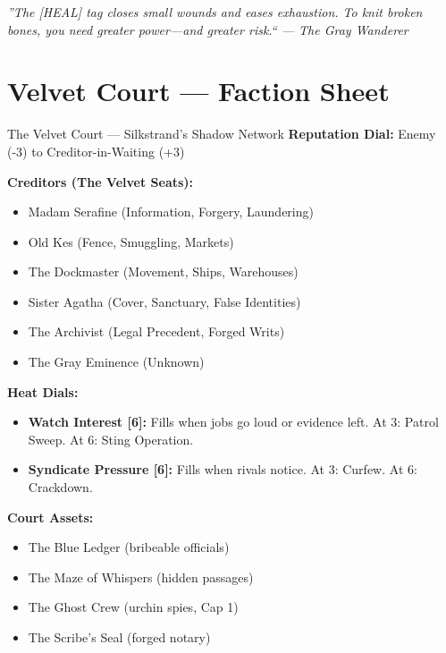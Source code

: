 \documentclass[10pt]{article}
\begin{document}
\vspace{0.5em}
\begin{center}
    {\small\sffamily\itshape ''The [HEAL] tag closes small wounds and eases exhaustion. To knit broken bones, you need greater power---and greater risk.`` --- The Gray Wanderer}
\end{center}

\newpage


\section*{Velvet Court --- Faction Sheet}

\begin{tipbox}{The Velvet Court --- Silkstrand's Shadow Network}
    \textbf{Reputation Dial:} Enemy (-3) to Creditor-in-Waiting (+3)
    
    \textbf{Creditors (The Velvet Seats):}
    \begin{itemize}
        \item Madam Serafine (Information, Forgery, Laundering)
        \item Old Kes (Fence, Smuggling, Markets)
        \item The Dockmaster (Movement, Ships, Warehouses)
        \item Sister Agatha (Cover, Sanctuary, False Identities)
        \item The Archivist (Legal Precedent, Forged Writs)
        \item The Gray Eminence (Unknown)
    \end{itemize}
    
    \textbf{Heat Dials:}
    \begin{itemize}
        \item \textbf{Watch Interest [6]:} Fills when jobs go loud or evidence left. At 3: Patrol Sweep. At 6: Sting Operation.
        \item \textbf{Syndicate Pressure [6]:} Fills when rivals notice. At 3: Curfew. At 6: Crackdown.
    \end{itemize}
    
    \textbf{Court Assets:}
    \begin{itemize}
        \item The Blue Ledger (bribeable officials)
        \item The Maze of Whispers (hidden passages)
        \item The Ghost Crew (urchin spies, Cap 1)
        \item The Scribe's Seal (forged notary)
    \end{itemize}
\end{tipbox}
\end{document}
